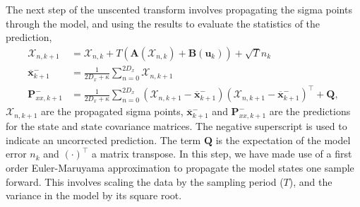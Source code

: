 The next step of the unscented transform involves propagating the sigma points through the model, and using the results to evaluate the statistics of the prediction,
\begin{align}\label{eqn: SigmaProp}%
\mathbf{\mathcal{X}}_{n,k+1} &= \mathbf{\mathcal{X}}_{n,k}+ T(\mathbf{A}(\mathbf{\mathcal{X}}_{n,k}) +\mathbf{B}(\mathbf{u}_{k})) +\sqrt{T}{n}_{k}\\
\label{eqn: PriorSMean}
\overline{\mathbf{x}}_{k+1}^{-} &= \frac{1}{2D_{x}+\kappa}\sum_{n=0}^{2D_{x}} \mathbf{\mathcal{X}}_{n,k+1}\\
\label{eqn: PriorSCov}
\mathbf{P}_{xx,k+1}^{-} &= \frac{1}{2D_{x}+\kappa}\sum_{n=0}^{2D_{x}} (\mathbf{\mathcal{X}}_{n,k+1} -\mathbf{\overline{x}}_{k+1}^{-})(\mathbf{\mathcal{X}}_{n,k+1}-\mathbf{\overline{x}}_{k+1}^{-})^{\top} + \mathbf{Q},%
\end{align} $\mathbf{\mathcal{X}}_{n,k+1}$ are the propagated sigma points, $\overline{\mathbf{x}}_{k+1}^{-}$ and $\mathbf{P}_{xx,k+1}^{-}$ are the predictions for the state and state covariance matrices. The negative superscript is used to indicate an uncorrected prediction. The term $\mathbf{Q}$ is the expectation of the model error $n_{k}$ and $(\cdot)^{\top}$ a matrix transpose. In this step, we have made use of a first order Euler-Maruyama approximation to propagate the model states one sample forward. This involves scaling the data by the sampling period ($T$), and the variance in the model by its square root.


